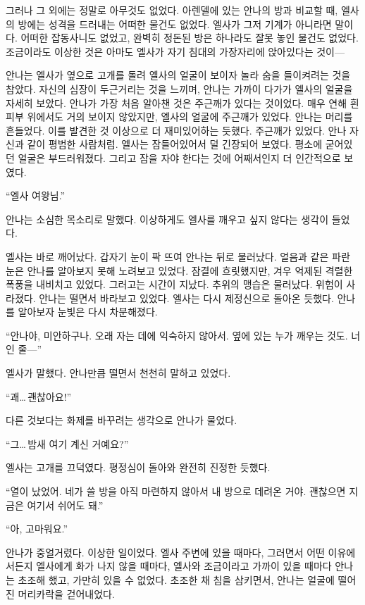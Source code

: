 그러나 그 외에는 정말로 아무것도 없었다. 아렌델에 있는 안나의 방과 비교할 때, 엘사의 방에는 성격을 드러내는 어떠한 물건도 없었다. 엘사가 그저 기계가 아니라면 말이다. 어떠한 잡동사니도 없었고, 완벽히 정돈된 방은 하나라도 잘못 놓인 물건도 없었다. 조금이라도 이상한 것은 아마도 엘사가 자기 침대의 가장자리에 앉아있다는 것이—

안나는 엘사가 옆으로 고개를 돌려 엘사의 얼굴이 보이자 놀라 숨을 들이켜려는 것을 참았다. 자신의 심장이 두근거리는 것을 느끼며, 안나는 가까이 다가가 엘사의 얼굴을 자세히 보았다. 안나가 가장 처음 알아챈 것은 주근깨가 있다는 것이었다. 매우 연해 흰 피부 위에서도 거의 보이지 않았지만, 엘사의 얼굴에 주근깨가 있었다. 안나는 머리를 흔들었다. 이를 발견한 것 이상으로 더 재미있어하는 듯했다. 주근깨가 있었다. 안나 자신과 같이 평범한 사람처럼. 엘사는 잠들어있어서 덜 긴장되어 보였다. 평소에 굳어있던 얼굴은 부드러워졌다. 그리고 잠을 자야 한다는 것에 어째서인지 더 인간적으로 보였다.

``엘사 여왕님.''

안나는 소심한 목소리로 말했다. 이상하게도 엘사를 깨우고 싶지 않다는 생각이 들었다.

엘사는 바로 깨어났다. 갑자기 눈이 팍 뜨여 안나는 뒤로 물러났다. 얼음과 같은 파란 눈은 안나를 알아보지 못해 노려보고 있었다. 잠결에 흐릿했지만, 겨우 억제된 격렬한 폭풍을 내비치고 있었다. 그러고는 시간이 지났다. 추위의 맹습은 물러났다. 위험이 사라졌다. 안나는 떨면서 바라보고 있었다. 엘사는 다시 제정신으로 돌아온 듯했다. 안나를 알아보자 눈빛은 다시 차분해졌다.

``안나야, 미안하구나. 오래 자는 데에 익숙하지 않아서. 옆에 있는 누가 깨우는 것도. 너인 줄—''

엘사가 말했다. 안나만큼 떨면서 천천히 말하고 있었다.

``괘\ldots\,괜찮아요!''

다른 것보다는 화제를 바꾸려는 생각으로 안나가 물었다.

``그\ldots\,밤새 여기 계신 거예요?''

엘사는 고개를 끄덕였다. 평정심이 돌아와 완전히 진정한 듯했다.

``열이 났었어. 네가 쓸 방을 아직 마련하지 않아서 내 방으로 데려온 거야. 괜찮으면 지금은 여기서 쉬어도 돼.''

``아, 고마워요.''

안나가 중얼거렸다. 이상한 일이었다. 엘사 주변에 있을 때마다, 그러면서 어떤 이유에서든지 엘사에게 화가 나지 않을 때마다, 엘사와 조금이라고 가까이 있을 때마다 안나는 초조해 했고, 가만히 있을 수 없었다. 초조한 채 침을 삼키면서, 안나는 얼굴에 떨어진 머리카락을 걷어내었다.

